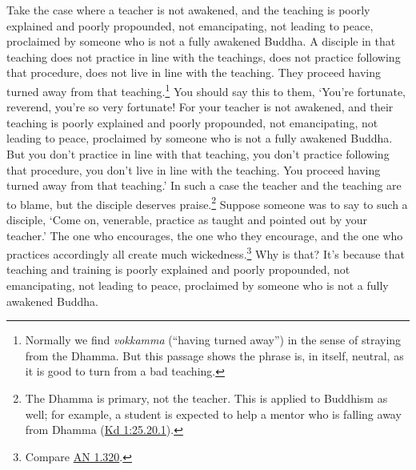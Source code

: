 \documentclass[12pt,openany]{book}%
\begin{document}
Take the case where a teacher is not awakened, and the teaching is poorly explained and poorly propounded, not emancipating, not leading to peace, proclaimed by someone who is not a fully awakened Buddha. A disciple in that teaching does not practice in line with the teachings, does not practice following that procedure, does not live in line with the teaching. They proceed having turned away from that teaching.\footnote{Normally we find \textit{vokkamma} (“having turned away”) in the sense of straying from the Dhamma. But this passage shows the phrase is, in itself, neutral, as it is good to turn from a bad teaching. } You should say this to them, ‘You’re fortunate, reverend, you’re so very fortunate! For your teacher is not awakened, and their teaching is poorly explained and poorly propounded, not emancipating, not leading to peace, proclaimed by someone who is not a fully awakened Buddha. But you don’t practice in line with that teaching, you don’t practice following that procedure, you don’t live in line with the teaching. You proceed having turned away from that teaching.’ In such a case the teacher and the teaching are to blame, but the disciple deserves praise.\footnote{The Dhamma is primary, not the teacher. This is applied to Buddhism as well; for example, a student is expected to help a mentor who is falling away from Dhamma (\href{https://suttacentral.net/pli-tv-kd1/en/sujato\#25.20.1}{Kd 1:25.20.1}). } Suppose someone was to say to such a disciple, ‘Come on, venerable, practice as taught and pointed out by your teacher.’ The one who encourages, the one who they encourage, and the one who practices accordingly all create much wickedness.\footnote{Compare \href{https://suttacentral.net/an1.320/en/sujato}{AN 1.320}. } Why is that? It’s because that teaching and training is poorly explained and poorly propounded, not emancipating, not leading to peace, proclaimed by someone who is not a fully awakened Buddha. 
\end{document}
